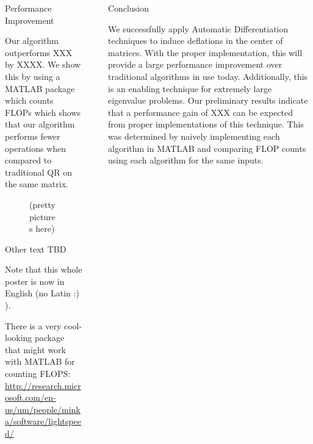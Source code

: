 \documentclass[final]{beamer}
\newlength{\sepwid}
\newlength{\onecolwid}
\newlength{\twocolwid}
\begin{document}
\begin{frame}[t]
\begin{columns}[t]
\begin{column}{\twocolwid}

\begin{alertblock}{Performance Improvement}

Our algorithm outperforms XXX by XXXX. We show this by using a MATLAB package
which counts FLOPs which shows that our algorithm performs fewer operations when
compared to traditional QR on the same matrix.

\begin{figure}[h]
(pretty pictures here)
\end{figure}

Other text TBD

Note that this whole poster is now in English (no Latin :) ).

There is a very cool-looking package that might work with MATLAB for counting
FLOPS:
\url{http://research.microsoft.com/en-us/um/people/minka/software/lightspeed/}

\end{alertblock}

\end{column} %

\begin{column}{\sepwid}\end{column} %

\begin{column}{\onecolwid} %


\begin{block}{Conclusion}

We successfully apply Automatic Differentiation techniques to induce deflations
in the center of matrices. With the proper implementation, this will provide a
large performance improvement over traditional algorithms in use today.
Additionally, this is an enabling technique for extremely large eigenvalue
problems. Our preliminary results indicate that a performance gain of XXX can be
expected from proper implementations of this technique. This was determined by
naively implementing each algorithm in MATLAB and comparing FLOP counts using
each algorithm for the same inputs.


\end{block}
\end{column}
\end{columns}
\end{frame}
\end{document}
